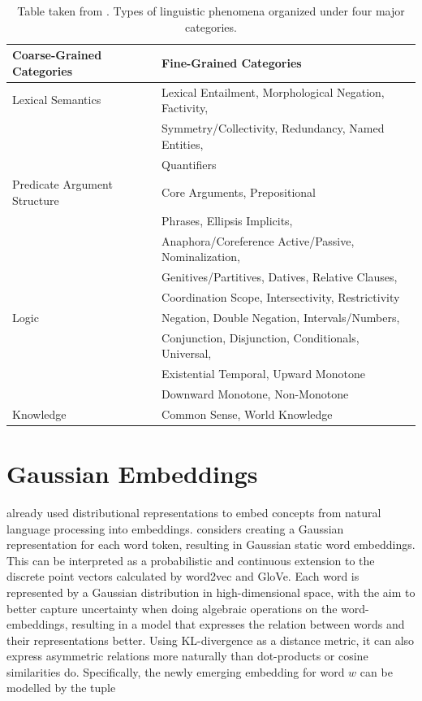 \documentclass[a4paper,12pt,oneside,openright]{report}
\begin{document}
\begin{table}[h!]
\centering
\begin{tabular}{l l} 
 \hline
 Coarse-Grained Categories & Fine-Grained Categories \\ [0.5ex] 
 \hline
 Lexical Semantics & Lexical Entailment, Morphological Negation, Factivity, \\
&  Symmetry/Collectivity, Redundancy, Named Entities, \\
& Quantifiers \\ 
Predicate Argument Structure & Core Arguments, Prepositional \\ & Phrases, Ellipsis \/ Implicits, \\
& Anaphora/Coreference Active/Passive, Nominalization, \\
& Genitives/Partitives, Datives, Relative Clauses, \\
& Coordination Scope, Intersectivity, Restrictivity \\
Logic & Negation, Double Negation, Intervals/Numbers, \\
& Conjunction, Disjunction, Conditionals, Universal, \\
& Existential Temporal, Upward Monotone \\
& Downward Monotone, Non-Monotone \\
Knowledge & Common Sense, World Knowledge \\ [1ex] 
\hline
\end{tabular}
\caption{Table taken from \cite{wang19}. Types of linguistic phenomena organized under four major categories.}
\label{table:1}
\end{table}

\section{Gaussian Embeddings}\label{appendix:GaussianEmbeddings}

\cite{bengio06} already used distributional representations to embed concepts from natural language processing into embeddings.
\cite{vilnis14} considers creating a Gaussian representation for each word token, resulting in Gaussian static word embeddings.
This can be interpreted as a probabilistic and continuous extension to the discrete point vectors calculated by word2vec and GloVe.
Each word is represented by a Gaussian distribution in high-dimensional space, with the aim to better capture uncertainty when doing algebraic operations on the word-embeddings, resulting in a model that expresses the relation between words and their representations better.
Using KL-divergence as a distance metric, it can also express asymmetric relations more naturally than dot-products or cosine similarities do.  
Specifically, the newly emerging embedding for word $w$ can be modelled by the tuple 
\end{document}
